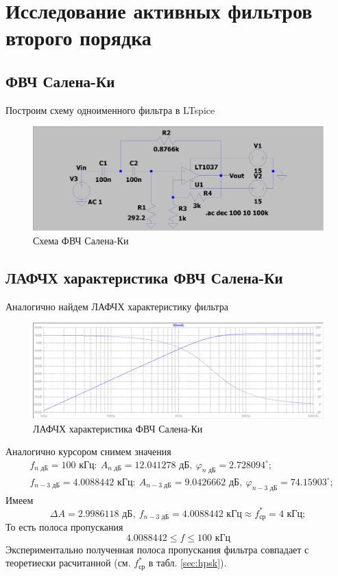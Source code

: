 \documentclass[a4paper, 12pt]{article}
\begin{document}
    \section{Исследование активных фильтров второго порядка}
    \subsection{ФВЧ Салена-Ки}
    Построим схему одноименного фильтра в LTspice
    \begin{figure}[H]
        \centering
        \includegraphics[scale=0.22]{scheme3.png}
        \captionsetup{skip=0pt}
        \caption{Схема ФВЧ Салена-Ки}
        \label{fig:scheme3}
    \end{figure}


    \subsection{ЛАФЧХ характеристика ФВЧ Салена-Ки}
    Аналогично найдем ЛАФЧХ характеристику фильтра
    \begin{figure}[H]
        \centering
        \includegraphics[scale=0.46]{3task_lapfr.png}
        \captionsetup{skip=0pt}
        \caption{ЛАФЧХ характеристика ФВЧ Салена-Ки}
        \label{fig:3task_lapfr}
    \end{figure}
    \noindent Аналогично курсором снимем значения
    \begin{align*}
    &f_{n\text{ дБ}}=100\text{ кГц}:\ A_{n\text{ дБ}}=12.041278\text{ дБ},\ \varphi_{n\text{ дБ}}=2.728094^{\circ};\\
    &f_{n-3\text{ дБ}}=4.0088442 \text{ кГц}:\ A_{n-3\text{ дБ}}=9.0426662\text{ дБ},\ \varphi_{n-3\text{ дБ}}=74.15903^{\circ};
    \end{align*}
    Имеем
    $$
    \Delta A=2.9986118\text{ дБ},\ f_{n-3\text{ дБ}}=4.0088442\text{ кГц}\approx f_\text{ср}^*=4\text{ кГц};
    $$
    То есть полоса пропускания
    $$
    4.0088442\leq f\leq100\text{ кГц}
    $$
    Экспериментально полученная полоса пропускания фильтра совпадает с теоретиески расчитанной (см. $f_\text{ср}^*$ в табл. \ref{sec:hpsk}).
\end{document}
